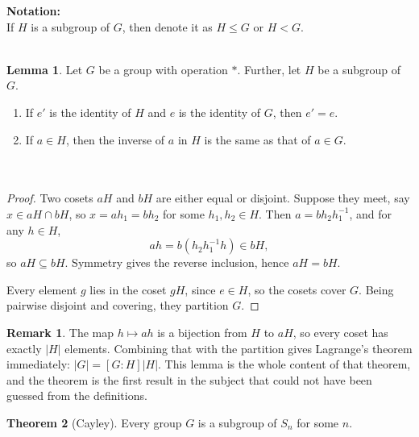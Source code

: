 \documentclass[11pt,a4paper]{article}
\theoremstyle{definition}
\newtheorem{thm}{Theorem}[subsection]
\newtheorem{lem}[thm]{Lemma}
\newtheorem*{remark}{Remark}
\begin{document}
\textbf{Notation:}\\
If $H$ is a subgroup of $G$, then denote it as $H\leq G$ or $H<G$.\\\\



\begin{lem}
Let $G$ be a group with operation $*$. Further, let $H$ be a subgroup of $G$.
\begin{enumerate}
\item[(a)] If $e'$ is the identity of $H$ and $e$ is the identity of $G$, then $e' = e$.
\item[(b)] If $a\in H$, then the inverse of $a$ in $H$ is the same as that of $a\in G$.\\\\\
\end{enumerate}
\end{lem}

\begin{proof}
Two cosets $aH$ and $bH$ are either equal or disjoint. Suppose they meet, say
$x\in aH\cap bH$, so $x = ah_1 = bh_2$ for some $h_1,h_2\in H$. Then
$a = bh_2h_1^{-1}$, and for any $h\in H$,
$$ah = b\left(h_2h_1^{-1}h\right) \in bH ,$$
so $aH\subseteq bH$. Symmetry gives the reverse inclusion, hence $aH = bH$.

Every element $g$ lies in the coset $gH$, since $e\in H$, so the cosets cover
$G$. Being pairwise disjoint and covering, they partition $G$.
\end{proof}

\begin{remark}
The map $h\mapsto ah$ is a bijection from $H$ to $aH$, so every coset has
exactly $\left|H\right|$ elements. Combining that with the partition gives
Lagrange's theorem immediately: $\left|G\right| = \left[G:H\right]\left|H\right|$.
This lemma is the whole content of that theorem, and the theorem is the first
result in the subject that could not have been guessed from the definitions.
\end{remark}








\begin{thm}[Cayley]
Every group $G$ is a subgroup of $S_n$ for some $n$.\\\\
\end{thm}
\end{document}
